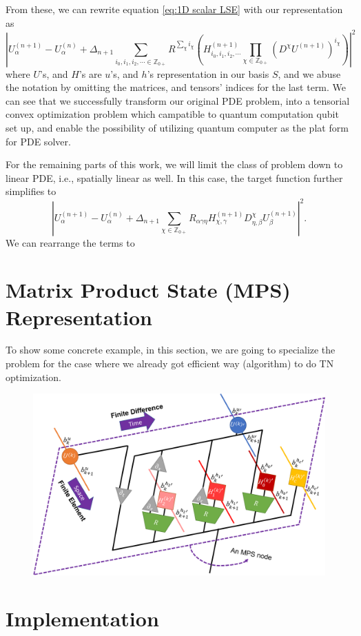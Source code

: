 \documentclass[preprint, 12pt]{revtex4-2}
\numberwithin{equation}{section}
\begin{document}
From these, we can rewrite equation \ref{eq:1D scalar LSE} with our representation as
\begin{equation}
    \left|U^{(n+1)}_\alpha - U^{(n)}_\alpha + \Delta_{n+1}\sum_{i_0, i_1, i_2, \cdots\in\mathbb{Z}_{0+}} R^{\sum_\chi i_\chi}\left(H^{(n+1)}_{i_0, i_1, i_2, \cdots}\prod_{\chi\in\mathbb{Z}_{0+}}\left(D^\chi U^{(n+1)}\right)^{i_\chi}\right)\right|^2
\end{equation}
where $U$'s, and $H$'s are $u$'s, and $h$'s representation in our basis $S$, and we abuse the notation by omitting the matrices, and tensors' indices for the last term. We can see that we successfully transform our original PDE problem, into a tensorial convex optimization problem which campatible to quantum computation qubit set up, and enable the possibility of utilizing quantum computer as the plat form for PDE solver.

For the remaining parts of this work, we will limit the class of problem down to linear PDE, i.e., spatially linear as well. In this case, the target function further simplifies to
\begin{equation}
    \left|U^{(n+1)}_\alpha - U^{(n)}_\alpha + \Delta_{n+1}\sum_{\chi\in\mathbb{Z}_{0+}} R_{\alpha\gamma\eta}H^{(n+1)}_{\chi, \gamma}D^\chi_{\eta,\beta} U^{(n+1)}_\beta\right|^2.
\end{equation}
We can rearrange the terms to

\section{Matrix Product State (MPS) Representation}
To show some concrete example, in this section, we are going to specialize the problem for the case where we already got efficient way (algorithm) to do TN optimization. 

\begin{figure}[ht!]
    \centering
    \includegraphics[width=0.8\columnwidth]{figure/MPS.png}
    \caption{}
    \label{fig:MPS}
\end{figure}

\section{Implementation}
\end{document}
